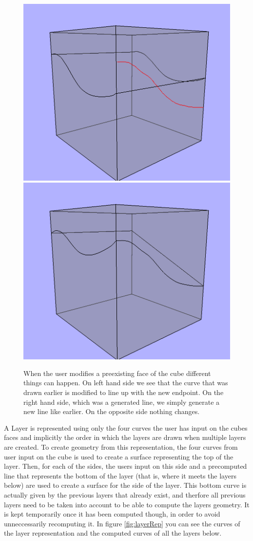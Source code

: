 \documentclass[a4paper,12pt]{report}
\begin{document}
\begin{figure}
\includegraphics[width=.5\linewidth]{thesis/modification1.png}
\includegraphics[width=.5\linewidth]{thesis/modification2.png}
 \caption{When the user modifies a preexisting face of the cube different things can happen. On left hand side we see that the curve that was drawn earlier is modified to line up with the new endpoint. On the right hand side, which was a generated line, we simply generate a new line like earlier. On the opposite side nothing changes.}
 \label{fig:layerModify}
\end{figure}

A Layer is represented using only the four curves the user has input on the cubes faces and implicitly the order in which the layers are drawn when multiple layers are created. To create geometry from this representation, the four curves from user input on the cube is used to create a surface representing the top of the layer. Then, for each of the sides, the users input on this side and a precomputed line that represents the bottom of the layer (that is, where it meets the layers below) are used to create a surface for the side of the layer. This bottom curve is actually given by the previous layers that already exist, and therfore all previous layers need to be taken into account to be able to compute the layers geometry. It is kept temporarily once it has been computed though, in order to avoid unneccessarily recomputing it. In figure \ref{fig:layerRep} you can see the curves of the layer representation and the computed curves of all the layers below.
\end{document}
